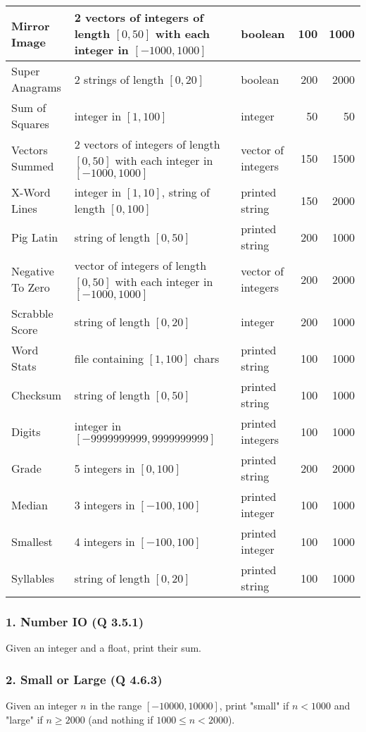 \documentclass{sig-alternate}
\begin{document}
\begin{table*}[t]
\begin{tabular}{|l | >{\raggedright}p{7.4cm} l rr|}
\hline
Mirror Image & 2 vectors of integers of length $[0,50]$ with each integer in $[-1000, 1000]$ & boolean & 100 & 1000 \\
\hline
Super Anagrams & 2 strings of length $[0, 20]$ & boolean & 200 & 2000 \\
\hline
Sum of Squares & integer in $[1, 100]$ & integer & 50 & 50 \\
\hline
Vectors Summed & 2 vectors of integers of length $[0,50]$ with each integer in $[-1000, 1000]$ & vector of integers & 150 & 1500 \\
\hline
X-Word Lines & integer in $[1, 10]$, string of length $[0, 100]$ & printed string & 150 & 2000 \\
\hline
Pig Latin & string of length $[0, 50]$ & printed string & 200 & 1000 \\
\hline
Negative To Zero & vector of integers of length $[0,50]$ with each integer in $[-1000, 1000]$ & vector of integers & 200 & 2000 \\
\hline
Scrabble Score & string of length $[0, 20]$ & integer & 200 & 1000 \\
\hline
Word Stats & file containing $[1, 100]$ chars & printed string & 100 & 1000 \\
\hline
Checksum & string of length $[0, 50]$ & printed string & 100 & 1000 \\
\hline
Digits & integer in $[-9999999999, 9999999999]$ & printed integers & 100 & 1000 \\
\hline
Grade & 5 integers in $[0, 100]$ & printed string & 200 & 2000 \\
\hline
Median & 3 integers in $[-100, 100]$ & printed integer & 100 & 1000 \\
\hline
Smallest & 4 integers in $[-100, 100]$ & printed integer & 100 & 1000 \\
\hline
Syllables & string of length $[0, 20]$ & printed string & 100 & 1000\\
\hline
\end{tabular}
\end{table*}

\subsubsection*{1. Number IO (Q 3.5.1)}
Given an integer and a float, print their sum.

\subsubsection*{2. Small or Large (Q 4.6.3)}
Given an integer $n$ in the range $[-10000, 10000]$, print "small" if $n < 1000$ and "large" if $n \ge 2000$ (and nothing if $1000 \le n < 2000$).
\end{document}
